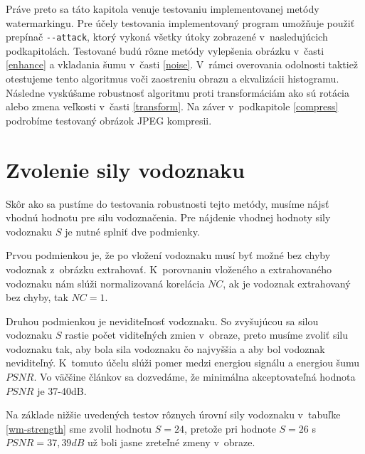 Práve preto sa táto kapitola venuje testovaniu implementovanej metódy watermarkingu. Pre účely testovania implementovaný program umožňuje použiť prepínač \verb|--attack|, ktorý vykoná všetky útoky zobrazené v~nasledujúcich podkapitolách.
Testované budú rôzne metódy vylepšenia obrázku v~časti \ref{enhance} a vkladania šumu v~časti \ref{noise}. V~rámci overovania odolnosti taktiež otestujeme tento algoritmus voči zaostreniu obrazu a ekvalizácii histogramu. Následne vyskúšame robustnosť algoritmu proti transformáciám ako sú rotácia alebo zmena veľkosti v~časti \ref{transform}. Na záver v~podkapitole \ref{compress} podrobíme testovaný obrázok JPEG kompresii.

\section{Zvolenie sily vodoznaku}
Skôr ako sa pustíme do testovania robustnosti tejto metódy, musíme nájsť vhodnú hodnotu pre silu vodoznačenia. Pre nájdenie vhodnej hodnoty sily vodoznaku $S$ je nutné splniť dve podmienky.

Prvou podmienkou je, že po vložení vodoznaku musí byť možné bez chyby vodoznak z~obrázku extrahovať. K~porovnaniu vloženého a extrahovaného vodoznaku nám slúži normalizovaná korelácia $NC$, ak je vodoznak extrahovaný bez chyby, tak $NC = 1$.

Druhou podmienkou je neviditeľnosť vodoznaku. So zvyšujúcou sa silou vodoznaku $S$ rastie počet viditeľných zmien v~obraze, preto musíme zvoliť silu vodoznaku tak, aby bola sila vodoznaku čo najvyššia a aby bol vodoznak neviditeľný. K~tomuto účelu slúži pomer medzi energiou signálu a energiou šumu $PSNR$. Vo väčšine článkov sa dozvedáme, že minimálna akceptovateľná hodnota $PSNR$ je 37-40dB.

Na základe nižšie uvedených testov rôznych úrovní sily vodoznaku v~tabuľke \ref{wm-strength} sme zvolil hodnotu $S=24$, pretože pri hodnote $S=26$ s~$PSNR=37,39dB$ už boli jasne zreteľné zmeny v~obraze. 
\clearpage

